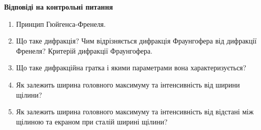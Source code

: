 \begin{center}
    \Large{\textbf{Відповіді на контрольні питання}}    
\end{center}

\vspace{1mm}

\begin{enumerate}
    \item Принцип Гюйгенса-Френеля.
    \bigbreak


    \item Що таке дифракція? Чим відрізняється дифракція Фраунгофера від дифракції
    Френеля? Критерій дифракції Фраунгофера.
    \bigbreak


    \item Що таке дифракційна гратка і якими параметрами вона характеризується?
    \bigbreak


    \item Як залежить ширина головного максимуму та інтенсивність від ширини щілини?
    \bigbreak

    \item Як залежить ширина головного максимуму та інтенсивність від відстані між щілиною та екраном при сталій ширині щілини?
    \bigbreak
    
\end{enumerate}
